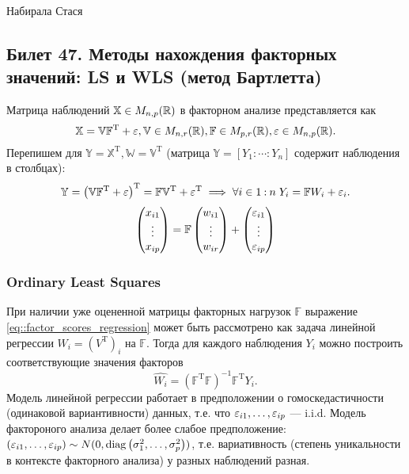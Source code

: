 {\color{blue} Набирала Стася}
\subsection{Билет 47. Методы нахождения факторных значений: LS и WLS (метод Бартлетта)}
  Матрица наблюдений $\mathbb X \in M_{n, p}(\mathbb{R})$ в факторном анализе представляется как 
  $$\mathbb X = \mathbb V \mathbb F^\mathrm T + \varepsilon, \mathbb V \in M_{n, r}(\mathbb{R}), \mathbb F \in M_{p, r}(\mathbb{R}), \varepsilon \in M_{n, p}(\mathbb{R}).$$
  Перепишем для $\mathbb Y = \mathbb X^\mathrm T, \mathbb W = \mathbb V^\mathrm T$ (матрица $\mathbb Y = \left[Y_1:\cdots:Y_n\right]$ содержит наблюдения в столбцах):
  $$\mathbb Y = \left(\mathbb V \mathbb F^\mathrm T+ \varepsilon\right)^\mathrm T = \mathbb F \mathbb V ^\mathrm T + \varepsilon^\mathrm T \implies \forall i\in 1\mathbin{:}n\; Y_i = \mathbb F W_i + \varepsilon_i.$$
  \begin{equation}\label{eq::factor_scores_regression}
    \begin{pmatrix}x_{i1} \\ \vdots \\ x_{ip}\end{pmatrix} = \mathbb F \begin{pmatrix}w_{i1} \\ \vdots \\ w_{ir}\end{pmatrix} + \begin{pmatrix}\varepsilon_{i1} \\ \vdots \\ \varepsilon_{ip}\end{pmatrix}
  \end{equation}
  
  \subsubsection{Ordinary Least Squares}
    При наличии уже оцененной матрицы факторных нагрузок $\mathbb F$ выражение \ref{eq::factor_scores_regression} может быть рассмотрено как задача линейной регрессии $W_i = (V^\mathrm T)_i$ на $\mathbb F$. Тогда для каждого наблюдения $Y_i$ можно построить соответствующие значения факторов
    $$\hat{W_i} = \left(\mathbb F^\mathrm T \mathbb F\right)^{-1}\mathbb F^\mathrm T Y_i.$$
    Модель линейной регрессии работает в предположении о гомоскедастичности (одинаковой вариантивности) данных, т.е. что $\varepsilon_{i1}, \ldots, \varepsilon_{ip}$ --- i.i.d. Модель фактороного анализа делает более слабое предположение: $\left(\varepsilon_{i1}, \ldots, \varepsilon_{ip}\right) \sim N(0, \operatorname{diag}{\left(\sigma_1^2, \ldots, \sigma_p^2\right)})$, т.е. вариативность (степень уникальности в контексте факторного анализа) у разных наблюдений разная.
  
